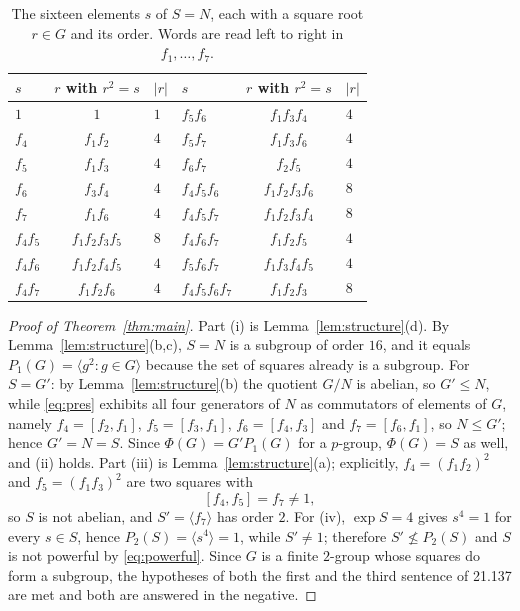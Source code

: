 \documentclass[11pt]{amsart}
\theoremstyle{remark}
\begin{document}
\begin{table}[htbp]
\caption{The sixteen elements $s$ of $S=N$, each with a square root $r\in G$ and its order.
Words are read left to right in $f_1,\dots,f_7$.}
\label{tab:roots}
\begin{tabular}{lcl@{\qquad\qquad}lcl}
\hline
$s$ & $r$ with $r^2=s$ & $|r|$ & $s$ & $r$ with $r^2=s$ & $|r|$\\
\hline
$1$        & $1$           & $1$ & $f_5f_6$      & $f_1f_3f_4$    & $4$\\
$f_4$      & $f_1f_2$      & $4$ & $f_5f_7$      & $f_1f_3f_6$    & $4$\\
$f_5$      & $f_1f_3$      & $4$ & $f_6f_7$      & $f_2f_5$       & $4$\\
$f_6$      & $f_3f_4$      & $4$ & $f_4f_5f_6$   & $f_1f_2f_3f_6$ & $8$\\
$f_7$      & $f_1f_6$      & $4$ & $f_4f_5f_7$   & $f_1f_2f_3f_4$ & $8$\\
$f_4f_5$   & $f_1f_2f_3f_5$& $8$ & $f_4f_6f_7$   & $f_1f_2f_5$    & $4$\\
$f_4f_6$   & $f_1f_2f_4f_5$& $4$ & $f_5f_6f_7$   & $f_1f_3f_4f_5$ & $4$\\
$f_4f_7$   & $f_1f_2f_6$   & $4$ & $f_4f_5f_6f_7$& $f_1f_2f_3$    & $8$\\
\hline
\end{tabular}
\end{table}

\begin{proof}[Proof of Theorem~\ref{thm:main}]
Part (i) is Lemma~\ref{lem:structure}(d). By Lemma~\ref{lem:structure}(b,c), $S=N$ is a
subgroup of order $16$, and it equals $P_1(G)=\langle g^2:g\in G\rangle$ because the set of
squares already is a subgroup. For $S=G'$: by
Lemma~\ref{lem:structure}(b) the quotient $G/N$ is abelian, so $G'\le N$, while
\eqref{eq:pres} exhibits all four generators of $N$ as commutators of elements of $G$,
namely $f_4=[f_2,f_1]$, $f_5=[f_3,f_1]$, $f_6=[f_4,f_3]$ and $f_7=[f_6,f_1]$, so $N\le G'$;
hence $G'=N=S$. Since $\Phi(G)=G'P_1(G)$ for a $p$-group, $\Phi(G)=S$ as well, and (ii)
holds. Part
(iii) is Lemma~\ref{lem:structure}(a); explicitly, $f_4=(f_1f_2)^2$ and $f_5=(f_1f_3)^2$
are two squares with
\[
 [f_4,f_5]=f_7\ne1 ,
\]
so $S$ is not abelian, and $S'=\langle f_7\rangle$ has order $2$. For (iv), $\exp S=4$
gives $s^4=1$ for every $s\in S$, hence $P_2(S)=\langle s^4\rangle=1$, while $S'\ne1$;
therefore $S'\not\le P_2(S)$ and $S$ is not powerful by \eqref{eq:powerful}. Since $G$ is a
finite $2$-group whose squares do form a subgroup, the hypotheses of both the first and the
third sentence of 21.137 are met and both are answered in the negative.
\end{proof}
\end{document}
